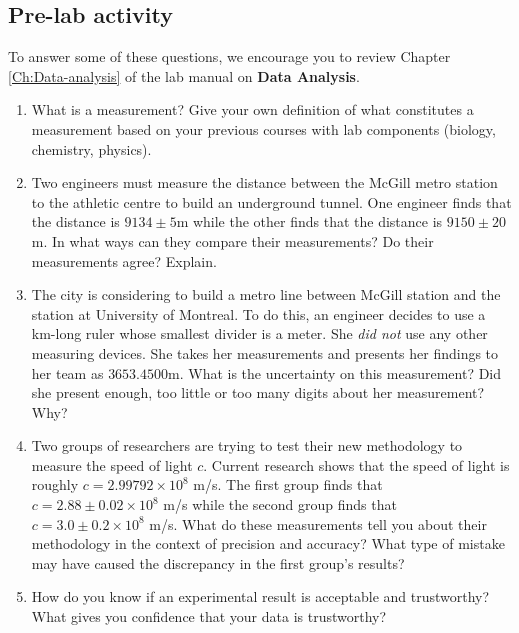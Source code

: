\documentclass[12pt]{report}
\begin{document}
\subsection{Pre-lab activity}
To answer some of these questions, we encourage you to review Chapter \ref{Ch:Data-analysis} of the lab manual on  \textbf{Data Analysis}.
\begin{enumerate}
\item What is a measurement? Give your own definition of what constitutes a measurement based on your previous courses with lab components (biology, chemistry, physics).
\item Two engineers must measure the distance between the McGill metro station to the athletic centre to build an underground tunnel. One engineer finds that the distance is $9134 \pm 5$m while the other finds that the distance is $9150 \pm 20$m. In what ways can they compare their measurements? Do their measurements agree? Explain.
\item The city is considering to build a metro line between McGill station and the station at University of Montreal. To do this, an engineer decides to use a km-long ruler whose smallest divider is a meter. She \textit{did not} use any other measuring devices. She takes her measurements and presents her findings to her team as $3653.4500$m. What is the uncertainty on this measurement? Did she present enough, too little or too many digits about her measurement? Why?
\item Two groups of researchers are trying to test their new methodology to measure the speed of light $c$. Current research shows that the speed of light is roughly $c=2.99 792 \times 10^8$ m/s. The first group finds that $c=2.88 \pm 0.02 \times 10^8$ m/s while the second group finds that $c=3.0 \pm 0.2 \times 10^8$ m/s. What do these measurements tell you about their methodology in the context of precision and accuracy? What type of mistake may have caused the discrepancy in the first group's results?
\item How do you know if an experimental result is acceptable and trustworthy? What gives you confidence that your data is trustworthy?
\end{enumerate}
\end{document}
